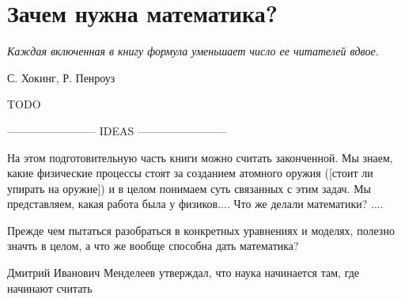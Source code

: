 \chapter{Зачем нужна математика?}\label{why_math}

\epigraph{\emph{Каждая включенная в книгу формула \break уменьшает число ее читателей вдвое.}}{С. Хокинг, Р. Пенроуз}

TODO

------------------------ IDEAS ------------------------ 

На этом подготовительную часть книги можно считать законченной.
Мы знаем, какие физические процессы стоят за созданием атомного оружия ([стоит ли упирать на оружие]) и в целом понимаем суть связанных с этим задач.
Мы представляем, какая работа была у физиков....
Что же делали математики? ....


Прежде чем пытаться разобраться в конкретных уравнениях и моделях, полезно значть в целом, а что же вообще способна дать математика?


Дмитрий Иванович Менделеев утверждал, что наука начинается там, где начинают считать
